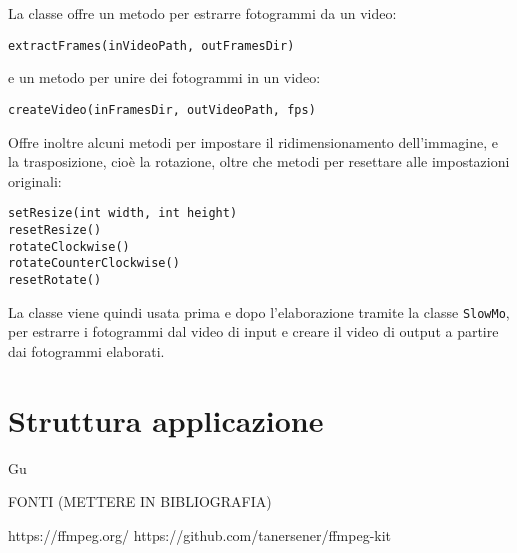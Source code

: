 La classe offre un metodo per estrarre fotogrammi da un video:
\begin{lstlisting}
extractFrames(inVideoPath, outFramesDir)
\end{lstlisting}

e un metodo per unire dei fotogrammi in un video:
\begin{lstlisting}
createVideo(inFramesDir, outVideoPath, fps)
\end{lstlisting}

Offre inoltre alcuni metodi per impostare il ridimensionamento dell'immagine, e la trasposizione,
cioè la rotazione, oltre che metodi per resettare alle impostazioni originali:

\begin{lstlisting}
setResize(int width, int height)
resetResize()
rotateClockwise()
rotateCounterClockwise()
resetRotate()
\end{lstlisting}

La classe viene quindi usata prima e dopo l'elaborazione tramite la classe \texttt{SlowMo}, 
per estrarre i fotogrammi dal video di input e creare il video di output a partire dai
fotogrammi elaborati.

\section{Struttura applicazione}
Gu


FONTI (METTERE IN BIBLIOGRAFIA)

https://ffmpeg.org/
https://github.com/tanersener/ffmpeg-kit